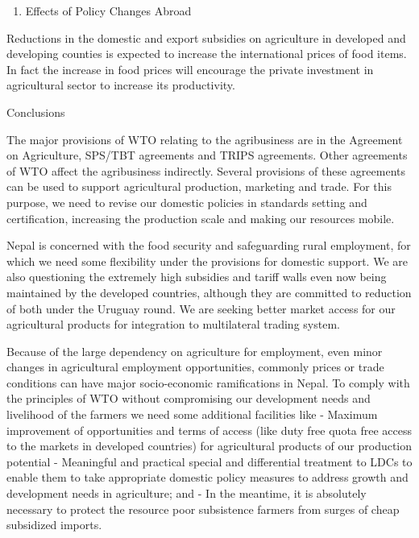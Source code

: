 \documentclass[
]{book}
\providecommand{\tightlist}{%
  \setlength{\itemsep}{0pt}\setlength{\parskip}{0pt}}
\begin{document}
\begin{enumerate}
\def\labelenumi{\arabic{enumi}.}
\setcounter{enumi}{7}
\tightlist
\item
  Effects of Policy Changes Abroad
\end{enumerate}

Reductions in the domestic and export subsidies on agriculture in developed and developing counties is expected to increase the international prices of food items. In fact the increase in food prices will encourage the private investment in agricultural sector to increase its productivity.

Conclusions

The major provisions of WTO relating to the agribusiness are in the Agreement on Agriculture, SPS/TBT agreements and TRIPS agreements. Other agreements of WTO affect the agribusiness indirectly. Several provisions of these agreements can be used to support agricultural production, marketing and trade. For this purpose, we need to revise our domestic policies in standards setting and certification, increasing the production scale and making our resources mobile.

Nepal is concerned with the food security and safeguarding rural employment, for which we need some flexibility under the provisions for domestic support. We are also questioning the extremely high subsidies and tariff walls even now being maintained by the developed countries, although they are committed to reduction of both under the Uruguay round. We are seeking better market access for our agricultural products for integration to multilateral trading system.

Because of the large dependency on agriculture for employment, even minor changes in agricultural employment opportunities, commonly prices or trade conditions can have major socio-economic ramifications in Nepal. To comply with the principles of WTO without compromising our development needs and livelihood of the farmers we need some additional facilities like
- Maximum improvement of opportunities and terms of access (like duty free quota free access to the markets in developed countries) for agricultural products of our production potential
- Meaningful and practical special and differential treatment to LDCs to enable them to take appropriate domestic policy measures to address growth and development needs in agriculture; and
- In the meantime, it is absolutely necessary to protect the resource poor subsistence farmers from surges of cheap subsidized imports.
\end{document}
